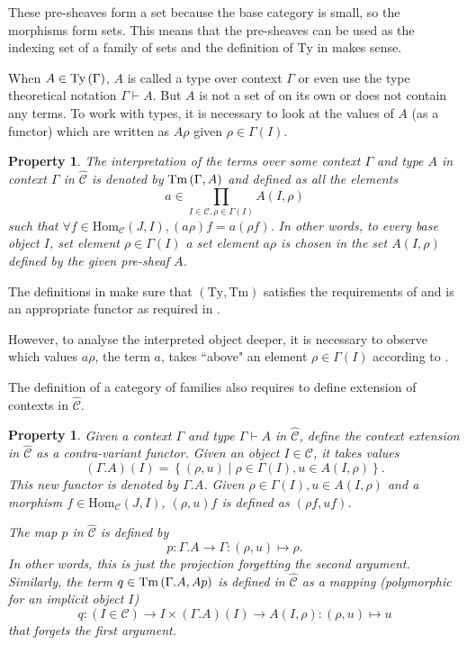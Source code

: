 \documentclass[12pt,a4paper,twoside,xetex]{book} %
\newtheorem{property}[theorem]{Property}
\newcommand{\psh}[1]{\widehat{#1}}
\begin{document}
These pre-sheaves form a set because the base category is small, so the 
morphisms form sets. This means that the pre-sheaves can be used as the indexing 
set of a family of sets and the definition of $\text{Ty}$ in  makes 
sense. 

When $A \in \text{Ty}\left(\Gamma\right)$,  $A$ is called a type over context $\Gamma$ 
or even use the type theoretical notation $\Gamma \vdash A$. But $A$ is not a 
set of on its own or does not contain any terms. To work with types, it is 
necessary to look at the values of $A$ (as a functor) which are written as 
$A\rho$ given $\rho \in \Gamma (I)$.

\begin{property}\label{pretm}
The interpretation of the terms over some context $\Gamma$ and type $A$ in 
context $\Gamma$ in $\psh{\mathcal{C}}$ is denoted by  $\text{Tm}\left(\Gamma,A\right)$ and defined as all the elements $$a 
\in \prod _{I \in \mathcal{C}, \rho \in \Gamma (I)} A(I,\rho)$$ such that 
$\forall f \in \text{Hom}_{\mathcal{C}}(J,I), (a \rho )f = a(\rho f).$ In other 
words, to every base object $I$, set element $\rho \in \Gamma (I)$ a set 
element $a\rho$ is chosen in the set $A(I,\rho)$ defined by the given pre-sheaf 
$A$. 

\end{property}

The definitions in  make sure that $(\text{Ty},\text{Tm})$  
satisfies the requirements of  and is an appropriate functor 
as required in .


However, to analyse the interpreted object deeper, it is necessary to 
observe which values $a\rho$, the term $a$, takes ``above" an element $\rho 
\in \Gamma (I)$ according to .

The definition of a category of families also requires to define extension 
of contexts in $\psh{\mathcal{C}}$. 

\begin{property}\label{preext}
Given a context $\Gamma$ and type $\Gamma \vdash A$ in $\psh{\mathcal{C}}$, define the context 
extension in $\psh{\mathcal{C}}$ as a contra-variant functor. Given an object $I 
\in \mathcal{C}$, it takes values $$(\Gamma . A)(I) = \left\{ (\rho , u) \mid 
\rho \in \Gamma (I) , u \in A (I, \rho ) \right\}.$$ This new functor is 
denoted by $\Gamma . A$. Given $\rho \in \Gamma (I), u \in A(I,\rho )$ and a 
morphism $f \in \text{Hom}_{\mathcal{C}}(J,I)$, $(\rho, u)f$ is defined as 
$(\rho f, uf)$. 


The map $p$ in $\psh{\mathcal{C}}$ is defined by $$p: \Gamma . A \rightarrow 
\Gamma : (\rho , u ) \mapsto \rho.$$ In other words, this is just the 
projection forgetting the second argument. Similarly, the term $q \in 
\text{Tm}\left(\Gamma . A,Ap\right) $ is defined in $\psh{\mathcal{C}}$ as a mapping 
(polymorphic for an implicit object $I$) $$q: (I \in \mathcal{C}) \rightarrow I 
\times (\Gamma . A)(I) \rightarrow A(I,\rho): (\rho, u) \mapsto u$$ that 
forgets the first argument.
\end{property}
\end{document}

